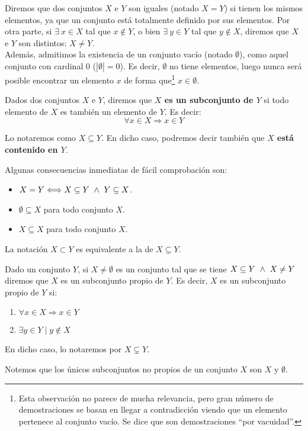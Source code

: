 Diremos que dos conjuntos $X$ e $Y$ son iguales (notado $X = Y$) si tienen los mismos elementos, ya que un conjunto está totalmente definido por sus elementos. Por otra parte, si $\exists \ x \in X$ tal que $x \notin Y$, o bien $\exists \ y \in Y$ tal que $y \notin X$, diremos que $X$ e $Y$ son distintos: $X \neq Y$.\\

Además, admitimos la existencia de un conjunto vacío (notado $\emptyset$), como aquel conjunto con cardinal 0 ($|\emptyset| = 0$). Es decir, $\emptyset$ no tiene elementos, luego nunca será posible encontrar un elemento $x$ de forma que\footnote{Esta observación no parece de mucha relevancia, pero gran número de demostraciones se basan en llegar a contradicción viendo que un elemento pertenece al conjunto vacío. Se dice que son demostraciones ``por vacuidad''.} $x\in \emptyset $.

\begin{definicion}[Subconjunto]
    Dados dos conjuntos $X$ e $Y$, diremos que \textbf{$X$ es un subconjunto de $Y$} si todo elemento de $X$ es también un elemento de $Y$. Es decir:
    $$\forall x \in X \Rightarrow x \in Y$$
    
    Lo notaremos como $X \subseteq Y$. En dicho caso, podremos decir también que \textbf{$X$ está contenido en $Y$}.
\end{definicion}

Algunas consecuencias inmediatas de fácil comprobación son:
\begin{itemize}
    \item $X = Y \Longleftrightarrow X \subseteq Y \ \land \  Y \subseteq X$.
    \item $\emptyset \subseteq X$ para todo conjunto $X$.
    \item $X \subseteq X$ para todo conjunto $X$.
\end{itemize}
\begin{notacion}
    La notación $X \subset Y$ es equivalente a la de $X \subseteq Y$.
\end{notacion}

\begin{definicion}
    Dado un conjunto $Y$, si $X \neq \emptyset$ es un conjunto tal que se tiene $X \subseteq Y \ \land \  X \neq Y$ diremos que $X$ es un subconjunto propio de $Y$.
    Es decir, $X$ es un subconjunto propio de $Y$ si:
    \begin{enumerate}
        \item $\forall x \in X \Rightarrow x \in Y$
        \item $\exists y \in Y \mid y \notin X$
    \end{enumerate}
    
    En dicho caso, lo notaremos por $X \subsetneq Y$.
\end{definicion}
Notemos que los únicos subconjuntos no propios de un conjunto $X$ son $X$ y $\emptyset $.

